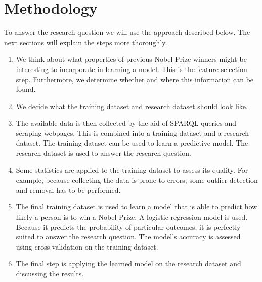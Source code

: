 \section{Methodology}
\label{sec:methodology}
To answer the research question we will use the approach described below. The next sections will explain the steps more thoroughly.
\begin{enumerate}
\item We think about what properties of previous Nobel Prize winners might be interesting to incorporate in learning a model. This is the feature selection step. Furthermore, we determine whether and where this information can be found.
\item We decide what the training dataset and research dataset should look like.
\item The available data is then collected by the aid of SPARQL queries and scraping webpages. This is combined into a training dataset and a research dataset. The training dataset can be used to learn a predictive model. The research dataset is used to answer the research question.
\item Some statistics are applied to the training dataset to assess its quality. For example, because collecting the data is prone to errors, some outlier detection and removal has to be performed.
\item The final training dataset is used to learn a model that is able to predict how likely a person is to win a Nobel Prize. A logistic regression model is used. Because it predicts the probability of particular outcomes, it is perfectly suited to answer the research question. The model's accuracy is assessed using cross-validation on the training dataset.
\item The final step is applying the learned model on the research dataset and discussing the results. 
\end{enumerate}

